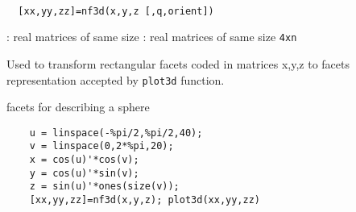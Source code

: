 \begin{mandesc}
   \\
\end{mandesc}
\begin{calling_sequence}
\begin{verbatim}
  [xx,yy,zz]=nf3d(x,y,z [,q,orient])
\end{verbatim}
\end{calling_sequence}
\begin{parameters}
  \begin{varlist}
    : real matrices of same size
    : real matrices of same size \verb!4xn!
  \end{varlist}
\end{parameters}
\begin{mandescription}
  Used to transform rectangular facets coded in matrices x,y,z
  to facets representation accepted by \verb!plot3d! function.
\end{mandescription}
\begin{examples}
\noindent facets for describing a sphere
  \begin{Verbatim}
    u = linspace(-%pi/2,%pi/2,40);
    v = linspace(0,2*%pi,20);
    x = cos(u)'*cos(v);
    y = cos(u)'*sin(v);
    z = sin(u)'*ones(size(v));
    [xx,yy,zz]=nf3d(x,y,z); plot3d(xx,yy,zz)
  \end{Verbatim}
\end{examples}
\begin{manseealso}
\end{manseealso}
